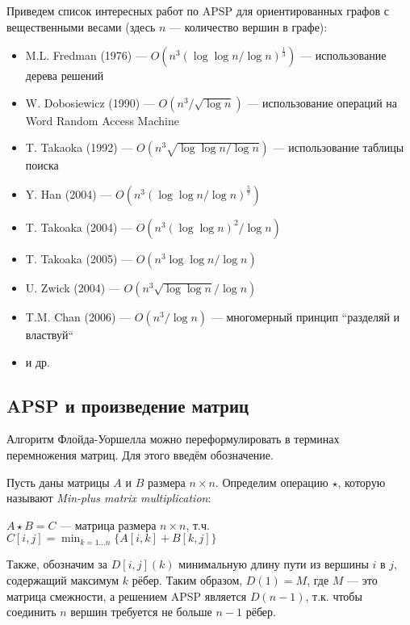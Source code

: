 \begin{remark}
Приведем список интересных работ по APSP для ориентированных графов с вещественными весами (здесь $n$ --- количество вершин в графе):
\begin{itemize}
    \item M.L. Fredman (1976) --- $O(n^3(\log \log n / \log n)^\frac{1}{3})$ --- использование дерева решений~\cite{FredmanAPSP1976}
    \item W. Dobosiewicz (1990) --- $O(n^3 / \sqrt{\log n})$ --- использование операций на Word Random Access Machine~\cite{Dobosiewicz1990}
    \item T. Takaoka (1992) --- $O(n^3 \sqrt{\log \log n / \log n})$ --- использование таблицы поиска~\cite{Takaoka1992}
    \item Y. Han (2004) --- $O(n^3 (\log \log n / \log n)^\frac{5}{7})$~\cite{Han2004}
    \item T. Takoaka (2004) --- $O(n^3 (\log \log n)^2 / \log n)$~\cite{Takaoka2004}
    \item T. Takoaka (2005) --- $O(n^3 \log \log n / \log n)$~\cite{Takaoka2005}
    \item U. Zwick (2004) --- $O(n^3 \sqrt{\log \log n} / \log n)$~\cite{Zwick2004}
    \item T.M. Chan (2006) --- $O(n^3 / \log n)$ --- многомерный принцип ``разделяй и властвуй``~\cite{Chan2008}
    \item и др.
\end{itemize}
\end{remark}

\subsection{APSP и произведение матриц}
Алгоритм Флойда-Уоршелла можно переформулировать в терминах перемножения матриц. Для этого введём обозначение.


\begin{definition}
Пусть даны матрицы $A$ и $B$ размера $n \times n$. Определим операцию $\star$, которую называют \textit{Min-plus matrix multiplication}:

    $A \star B = C$ --- матрица размера $n \times n$, т.ч. 
    $C[i,j] = \min_{k = 1 \dots n} \{ A[i,k] + B[k,j] \}$
\end{definition}

Также, обозначим за $D[i,j](k)$ минимальную длину пути из вершины $i$ в $j$, содержащий максимум $k$ рёбер.
Таким образом, $D(1) = M$, где $M$ --- это матрица смежности, а решением APSP является $D(n-1)$, т.к. чтобы соединить $n$ вершин требуется не больше $n-1$ рёбер.


